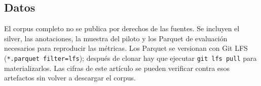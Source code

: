\subsection{Datos}

El corpus completo no se publica por derechos de las fuentes. Se incluyen el silver, las anotaciones, la muestra del piloto y los Parquet de evaluaci\'on necesarios para reproducir las m\'etricas. Los Parquet se versionan con Git LFS (\texttt{*.parquet filter=lfs}); despu\'es de clonar hay que ejecutar \texttt{git lfs pull} para materializarlos. Las cifras de este art\'iculo se pueden verificar contra esos artefactos sin volver a descargar el corpus.
